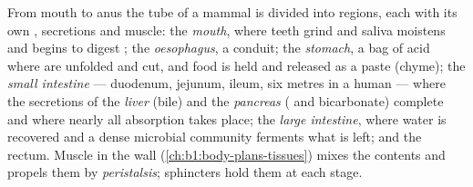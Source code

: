 \begin{proposition}\label{prop:b1:digestion-absorption:tract}
From mouth to anus the tube of a mammal is divided into regions, each
with its own , secretions and muscle: the \emph{mouth}, where
teeth grind and saliva moistens and begins to digest ; the
\emph{oesophagus}, a conduit; the \emph{stomach}, a bag of acid where
 are unfolded and cut, and food is held and released as a
paste (chyme); the \emph{small intestine} --- duodenum, jejunum, ileum,
six metres in a human --- where the secretions of the \emph{liver}
(bile) and the \emph{pancreas} ( and bicarbonate) complete
 and where nearly all absorption takes place; the \emph{large
intestine}, where water is recovered and a dense microbial community
ferments what is left; and the rectum. Muscle in the wall
(\cref{ch:b1:body-plans-tissues}) mixes the contents and propels them
by \emph{peristalsis}; sphincters hold them at each stage.
\end{proposition}

